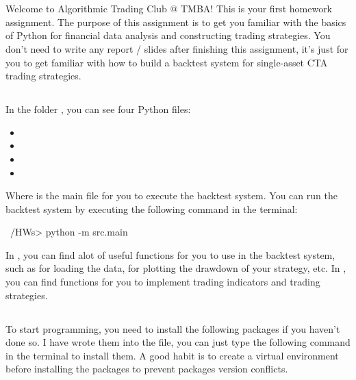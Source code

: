 \documentclass[a4paper, 12pt]{article}
\begin{document}
\section*{}
Welcome to Algorithmic Trading Club @ TMBA! This is your first
homework assignment. The purpose of this assignment is to get you
familiar with the basics of Python for financial data analysis and
constructing trading strategies. You don't need to write any report / slides
after finishing this assignment, it's just for you to get familiar with how to
build a backtest system for single-asset CTA trading strategies.

\subsection*{}

In the folder , you can see four Python files:

\begin{itemize}
    \item {}
    \item {}
    \item {}
    \item {}
\end{itemize}

\noindent Where  is the main file for you to execute the
backtest system. You can run the backtest system by executing the following
command in the terminal:

\begin{python}
~/HWs> python -m src.main
\end{python}

\noindent In , you can find alot of useful functions
for you to use in the backtest system, such as  for
loading the data,  for plotting the drawdown of your strategy, etc. In
, you can find functions for you to implement trading
indicators and trading strategies.

\subsection*{}

To start programming, you need to install the following packages if you haven't
done so. I have wrote them into the  file, you can
just type the following command in the terminal to install them. A good habit is to
create a virtual environment before installing the packages to prevent packages version conflicts.
\end{document}

